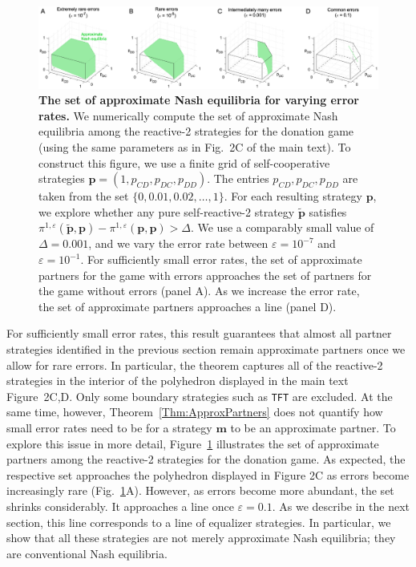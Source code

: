 \documentclass[9pt,twoside,lineno]{pnas-new}
\theoremstyle{plainCl1}
\theoremstyle{plainCl2}
\def\tft{\texttt{TFT}}
\begin{document}
\begin{figure}[t!]
    \centering
    \includegraphics[width=\textwidth]{../../figures/ApproxmiateNash_strict.eps}
    \caption{\textbf{The set of approximate Nash equilibria for varying error rates.} We numerically compute the set of approximate Nash equilibria among the reactive-2 strategies for the donation game (using the same parameters as in Fig.~2C of the main text). To construct this figure, we use a finite grid of self-cooperative strategies $\mathbf{p}\!=\!(1,p_{CD},p_{DC},p_{DD})$. The entries $p_{CD},p_{DC},p_{DD}$ are taken from the set $\{0,0.01,0.02,\ldots,1\}$. For each resulting strategy $\mathbf{p}$, we explore whether any pure self-reactive-2 strategy $\mathbf{\tilde p}$ satisfies $\pi^{1,\varepsilon}(\mathbf{\tilde p},\mathbf{p}) - \pi^{1,\varepsilon}(\mathbf{p},\mathbf{p}) > \Delta$. We use a comparably small value of $\Delta\!=\!0.001$, and we vary the error rate between $\varepsilon\!=\!10^{-7}$ and $\varepsilon\!=\!10^{-1}$. For sufficiently small error rates, the set of approximate partners for the game with errors approaches the set of partners for the game without errors (panel A). As we increase the error rate, the set of approximate partners approaches a line (panel D).}
    \label{fig:ApproximateNash}
\end{figure}

\noindent
For sufficiently small error rates, this result guarantees that almost all partner strategies identified in the previous section remain approximate partners once we allow for rare errors. 
In particular, the theorem captures all of the reactive-2 strategies in the interior of the polyhedron displayed in the main text Figure~2C,D.
Only some boundary strategies such as \tft{} are excluded. 
At the same time, however, Theorem~\ref{Thm:ApproxPartners} does not quantify how small error rates need to be for a strategy $\mathbf{m}$ to be an approximate partner. 
To explore this issue in more detail, Figure~\ref{fig:ApproximateNash} illustrates the set of approximate partners among the reactive-2 strategies for the donation game. 
As expected, the respective set approaches the polyhedron displayed in Figure 2C as errors become increasingly rare (Fig.~\ref{fig:ApproximateNash}A). 
However, as errors become more abundant, the set shrinks considerably. 
It approaches a line once $\varepsilon\!=\!0.1$. 
As we describe in the next section, this line corresponds to a line of equalizer strategies. 
In particular, we show that all these strategies are not merely approximate Nash equilibria; they are conventional Nash equilibria.\\
\end{document}
